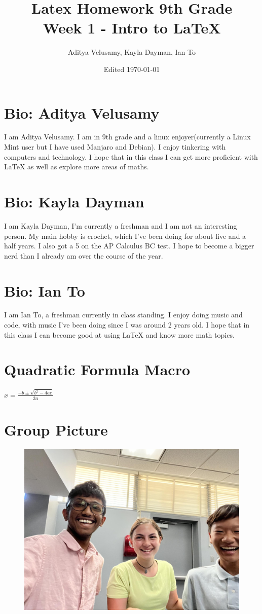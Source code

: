 \documentclass{article}
\title{Latex Homework 9th Grade\\  Week 1 - Intro to LaTeX}
\author{Aditya Velusamy, Kayla Dayman, Ian To}
\date{Edited \today}
\newcommand{\quadform}{$x=\frac{-b\pm\sqrt{b^2-4ac}}{2a}$}
\begin{document}
\maketitle

\section{Bio: Aditya Velusamy}
I am Aditya Velusamy. I am in 9th grade and a linux enjoyer(currently a Linux Mint user but I have used Manjaro and Debian). I enjoy tinkering with computers and technology. I hope that in this class I can get more proficient with LaTeX as well as explore more areas of maths.
\section{Bio: Kayla Dayman}
I am Kayla Dayman, I'm currently a freshman and I am not an interesting person. My main hobby is crochet, which I've been doing for about five and a half years. I also got a 5 on the AP Calculus BC test. I hope to become a bigger nerd than I already am over the course of the year.
\section{Bio: Ian To}
I am Ian To, a freshman currently in class standing. I enjoy doing music and code, with music I've been doing since I was around 2 years old. I hope that in this class I can become
good at using LaTeX and know more math topics.
\section{Quadratic Formula Macro}
\quadform
\section{Group Picture}
\begin{figure}
\centering
\includegraphics[scale=0.2]{./IMG_1617.jpg}
\end{figure}
\end{document}
